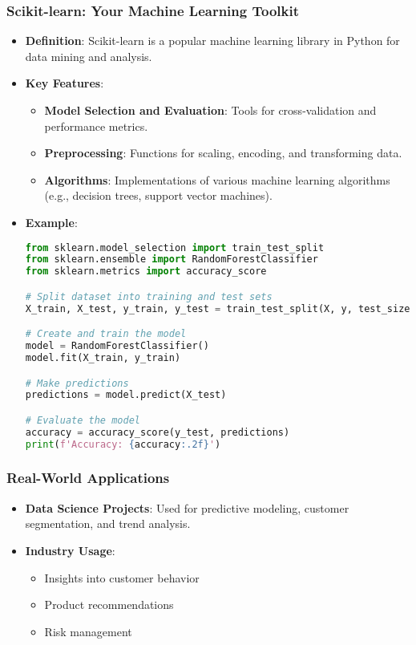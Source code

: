 \documentclass[aspectratio=169]{beamer}
\begin{document}
\begin{frame}[fragile]
    \frametitle{Scikit-learn: Your Machine Learning Toolkit}
    \begin{itemize}
        \item \textbf{Definition}: Scikit-learn is a popular machine learning library in Python for data mining and analysis.
        \item \textbf{Key Features}:
        \begin{itemize}
            \item \textbf{Model Selection and Evaluation}: Tools for cross-validation and performance metrics.
            \item \textbf{Preprocessing}: Functions for scaling, encoding, and transforming data.
            \item \textbf{Algorithms}: Implementations of various machine learning algorithms (e.g., decision trees, support vector machines).
        \end{itemize}
        \item \textbf{Example}:
        \begin{lstlisting}[language=Python]
from sklearn.model_selection import train_test_split
from sklearn.ensemble import RandomForestClassifier
from sklearn.metrics import accuracy_score

# Split dataset into training and test sets
X_train, X_test, y_train, y_test = train_test_split(X, y, test_size=0.2, random_state=42)

# Create and train the model
model = RandomForestClassifier()
model.fit(X_train, y_train)

# Make predictions
predictions = model.predict(X_test)

# Evaluate the model
accuracy = accuracy_score(y_test, predictions)
print(f'Accuracy: {accuracy:.2f}')
        \end{lstlisting}
    \end{itemize}
\end{frame}

\begin{frame}[fragile]
    \frametitle{Real-World Applications}
    \begin{itemize}
        \item \textbf{Data Science Projects}: Used for predictive modeling, customer segmentation, and trend analysis.
        \item \textbf{Industry Usage}: 
        \begin{itemize}
            \item Insights into customer behavior
            \item Product recommendations
            \item Risk management
        \end{itemize}
    \end{itemize}
\end{frame}
\end{document}
